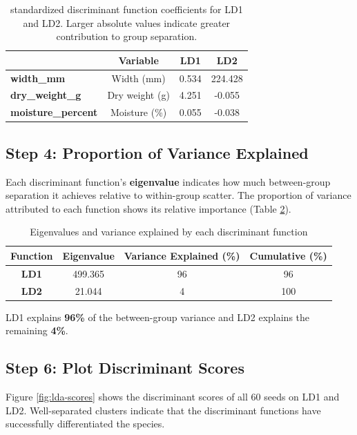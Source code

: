 \documentclass[
]{book}
\begin{document}
\begin{table}
\centering
\caption{\label{tab:std-coeffs}standardized discriminant function coefficients for LD1 and LD2. Larger absolute values indicate greater contribution to group separation.}
\centering
\begin{tabular}[t]{>{}l|c|c|c}
\hline
  & Variable & LD1 & LD2\\
\hline
\textbf{width\_mm} & Width (mm) & 0.534 & 224.428\\
\hline
\textbf{dry\_weight\_g} & Dry weight (g) & 4.251 & -0.055\\
\hline
\textbf{moisture\_percent} & Moisture (\%) & 0.055 & -0.038\\
\hline
\end{tabular}
\end{table}

\subsection{Step 4: Proportion of Variance Explained}\label{step-4-proportion-of-variance-explained}

Each discriminant function's \textbf{eigenvalue} indicates how much between-group separation it achieves relative to within-group scatter. The proportion of variance attributed to each function shows its relative importance (Table \ref{tab:eigenvalue-table-lda}).

\begin{table}
\centering
\caption{\label{tab:eigenvalue-table-lda}Eigenvalues and variance explained by each discriminant function}
\centering
\begin{tabular}[t]{>{}c|c|c|c}
\hline
Function & Eigenvalue & Variance Explained (\%) & Cumulative (\%)\\
\hline
\textbf{LD1} & 499.365 & 96 & 96\\
\hline
\textbf{LD2} & 21.044 & 4 & 100\\
\hline
\end{tabular}
\end{table}

LD1 explains \textbf{96\%} of the between-group variance and LD2 explains the remaining \textbf{4\%}.

\subsection{Step 6: Plot Discriminant Scores}\label{step-6-plot-discriminant-scores}

Figure \ref{fig:lda-scores} shows the discriminant scores of all 60 seeds on LD1 and LD2. Well-separated clusters indicate that the discriminant functions have successfully differentiated the species.
\end{document}

